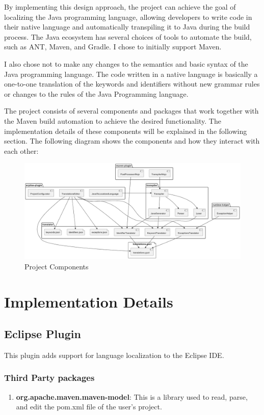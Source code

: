 By implementing this design approach, the project can achieve the goal of localizing the Java programming language, allowing developers to write code in their native language and automatically transpiling it to Java during the build process. The Java ecosystem has several choices of tools to automate the build, such as ANT, Maven, and Gradle. I chose to initially support Maven.

I also chose not to make any changes to the semantics and basic syntax of the Java programming language. The code written in a native language is basically a one-to-one translation of the keywords and identifiers without new grammar rules or changes to the rules of the Java Programming language.

The project consists of several components and packages that work together with the Maven build automation to achieve the desired functionality. The implementation details of these components will be explained in the following section. The following diagram shows the components and how they interact with each other:

\begin{figure}[h]
\centering
\includegraphics[width=15cm]{ch3-images/components.png}
\caption{Project Components}
\label{fig:Project Components}
\end{figure} 

\section{Implementation Details}
\subsection{Eclipse Plugin}
This plugin adds support for language localization to the Eclipse IDE. 

\subsubsection{Third Party packages}
\begin{enumerate}
    \item \textbf{org.apache.maven.maven-model}: This is a library used to read, parse, and edit the pom.xml file of the user's project.
\end{enumerate}

